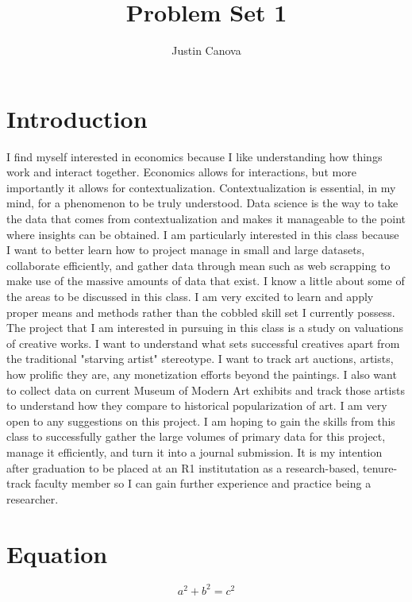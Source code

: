 \documentclass{article}
\title{Problem Set 1}
\author{Justin Canova}
\begin{document}
\maketitle

\section{Introduction}

I find myself interested in economics because I like understanding how things work and interact together.  Economics allows for interactions, but more importantly it allows for contextualization.  Contextualization is essential, in my mind, for a phenomenon to be truly understood.  Data science is the way to take the data that comes from contextualization and makes it manageable to the point where insights can be obtained.  I am particularly interested in this class because I want to better learn how to project manage in small and large datasets, collaborate efficiently, and gather data through mean such as web scrapping to make use of the massive amounts of data that exist.  I know a little about some of the areas to be discussed in this class.  I am very excited to learn and apply proper means and methods rather than the cobbled skill set I currently possess.  The project that I am interested in pursuing in this class is a study on valuations of creative works.  I want to understand what sets successful creatives apart from the traditional "starving artist" stereotype.  I want to track art auctions, artists, how prolific they are, any monetization efforts beyond the paintings.  I also want to collect data on current Museum of Modern Art exhibits and track those artists to understand how they compare to historical popularization of art.  I am very open to any suggestions on this project.  I am hoping to gain the skills from this class to successfully gather the large volumes of primary data for this project, manage it efficiently, and turn it into a journal submission.  It is my intention after graduation to be placed at an R1 institutation as a research-based, tenure-track faculty member so I can gain further experience and practice being a researcher.
\section{Equation}
\[ a^2 + b^2 = c^2 \]
\end{document}
